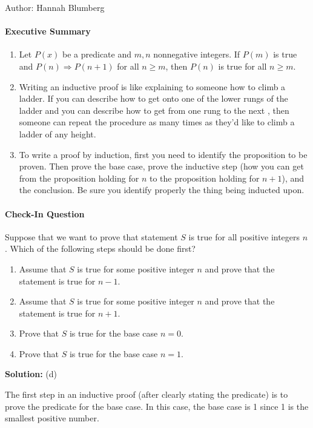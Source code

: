 \documentclass[solution, letterpaper]{cs20inclass}
\begin{document}

\noindent Author: Hannah Blumberg%

\paragraph*{Executive Summary}

\begin{enumerate}
\item Let $P(x)$ be a predicate and $m, n$ nonnegative integers.  If $P(m)$ is true and $P(n) \Rightarrow P(n+1)$ for all $n \ge m$, then $P(n)$ is true for all $n \ge m$.
\item Writing an inductive proof is like explaining to someone how to climb a ladder. If you can describe how to get onto one of the lower rungs of the ladder and you can describe how to get from one rung to the next , then someone can repeat the procedure as many times as they'd like to climb a ladder of any height.
\item To write a proof by induction, first you need to identify the proposition to be proven.  Then prove the base case, prove the inductive step (how you can get from the proposition holding for $n$ to the proposition holding for $n+1$), and the conclusion.  Be sure you identify properly the thing being inducted upon.

\end{enumerate}

\paragraph*{Check-In Question}
Suppose that we want to prove that statement $S$ is true for all positive integers $n$. Which of the following steps should be done first?
\begin{enumerate}
\item	Assume that $S$ is true for some positive integer $n$ and prove that the statement is true for $n-1$.
\item	Assume that $S$ is true for some positive integer $n$ and prove that the statement is true for $n+1$.
\item	Prove that $S$ is true for the base case $n = 0$.
\item	Prove that $S$ is true for the base case $n = 1$.
\end{enumerate}

\textbf{Solution:} (d)

The first step in an inductive proof (after clearly stating the predicate) is to prove the predicate for the base case. In this case, the base case is 1 since 1 is the smallest positive number.
\end{document}
